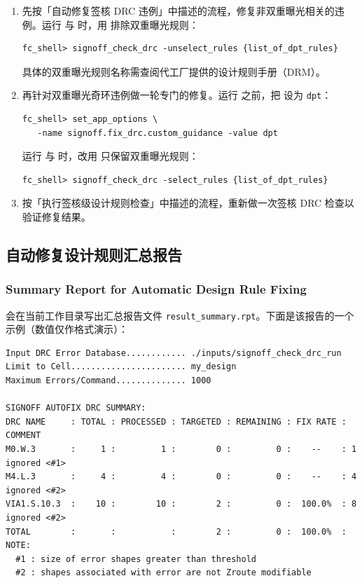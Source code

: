 \begin{enumerate}
  \item 先按「自动修复签核 DRC 违例」中描述的流程，修复非双重曝光相关的违例。运行  与  时，用  排除双重曝光规则：
\begin{lstlisting}
fc_shell> signoff_check_drc -unselect_rules {list_of_dpt_rules}
\end{lstlisting}
        \begin{noteBox}
        具体的双重曝光规则名称需查阅代工厂提供的设计规则手册（DRM）。
        \end{noteBox}

  \item 再针对双重曝光奇环违例做一轮专门的修复。运行  之前，把  设为 \texttt{dpt}：
\begin{lstlisting}
fc_shell> set_app_options \
   -name signoff.fix_drc.custom_guidance -value dpt
\end{lstlisting}
        运行  与  时，改用  只保留双重曝光规则：
\begin{lstlisting}
fc_shell> signoff_check_drc -select_rules {list_of_dpt_rules}
\end{lstlisting}

  \item 按「执行签核级设计规则检查」中描述的流程，重新做一次签核 DRC 检查以验证修复结果。
\end{enumerate}

\subsection{自动修复设计规则汇总报告}
\subsubsection*{Summary Report for Automatic Design Rule Fixing}

 会在当前工作目录写出汇总报告文件 \texttt{result\_summary.rpt}。下面是该报告的一个示例（数值仅作格式演示）：

\begin{lstlisting}
Input DRC Error Database............ ./inputs/signoff_check_drc_run
Limit to Cell....................... my_design
Maximum Errors/Command.............. 1000

SIGNOFF AUTOFIX DRC SUMMARY:
DRC NAME     : TOTAL : PROCESSED : TARGETED : REMAINING : FIX RATE : COMMENT
M0.W.3       :     1 :         1 :        0 :         0 :    --    : 1 ignored <#1>
M4.L.3       :     4 :         4 :        0 :         0 :    --    : 4 ignored <#2>
VIA1.S.10.3  :    10 :        10 :        2 :         0 :  100.0%  : 8 ignored <#2>
TOTAL        :       :           :        2 :         0 :  100.0%  :
NOTE:
  #1 : size of error shapes greater than threshold
  #2 : shapes associated with error are not Zroute modifiable
\end{lstlisting}

